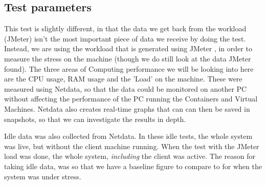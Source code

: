 \subsection{Test parameters}
\label{Test4TestParameters}
This test is slightly different, in that the data we get back from the workload (JMeter) isn't the most important piece of data we receive by doing the test. Instead, we are using the workload that is generated using JMeter \citep{ApacheJMeter}, in order to measure the stress on the machine (though we do still look at the data JMeter found). The three areas of Computing performance we will be looking into here are the CPU usage, RAM usage and the 'Load' on the machine. These were measured using Netdata\citep{Netdata}, so that the data could be monitored on another PC without affecting the performance of the PC running the Containers and Virtual Machines. Netdata also creates real-time graphs that can can then be saved in snapshots, so that we can investigate the results in depth.

Idle data was also collected from Netdata. In these idle tests, the whole system was live, but without the client machine running. When the test with the JMeter load was done, the whole system, \emph{including} the client was active. The reason for taking idle data, was so that we have a baseline figure to compare to for when the system was under stress.

